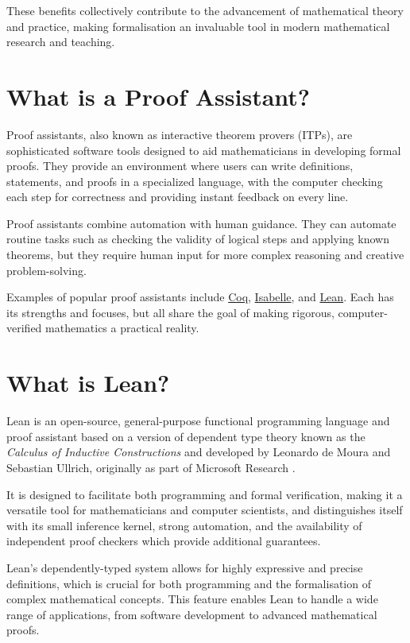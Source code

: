 These benefits collectively contribute to the advancement of mathematical theory and practice,
making formalisation an invaluable tool in modern mathematical research and teaching.

\section{What is a Proof Assistant?}

Proof assistants, also known as interactive theorem provers (ITPs), are sophisticated software tools
designed to aid mathematicians in developing formal proofs. They provide an environment where users
can write definitions, statements, and proofs in a specialized language, with the computer checking
each step for correctness and providing instant feedback on every line.

Proof assistants combine automation with human guidance. They can automate routine tasks such as checking
the validity of logical steps and applying known theorems, but they require human input for more complex
reasoning and creative problem-solving.

Examples of popular proof assistants include \href{https://coq.inria.fr}{Coq}, \href{https://isabelle.in.tum.de}{Isabelle},
and \href{https://lean-lang.org}{Lean}. Each has its strengths and focuses, but all share the goal of
making rigorous, computer-verified mathematics a practical reality.

\newpage
\section{What is Lean?}

Lean is an open-source, general-purpose functional programming language and proof assistant
based on a version of dependent type theory known as the \textit{Calculus of Inductive Constructions} \cite{Carneiro2019} and
developed by Leonardo de Moura and Sebastian Ullrich, originally as part of Microsoft Research \cite{Moura2021} \cite{Moura2024}.

It is designed to facilitate both programming and formal verification, making it a versatile tool
for mathematicians and computer scientists, and distinguishes itself with its small inference kernel,
strong automation, and the availability of independent proof checkers which provide additional guarantees.

Lean's dependently-typed system allows for highly expressive and precise definitions, which is crucial
for both programming and the formalisation of complex mathematical concepts.
This feature enables Lean to handle a wide range of applications, from software development to advanced mathematical proofs.

